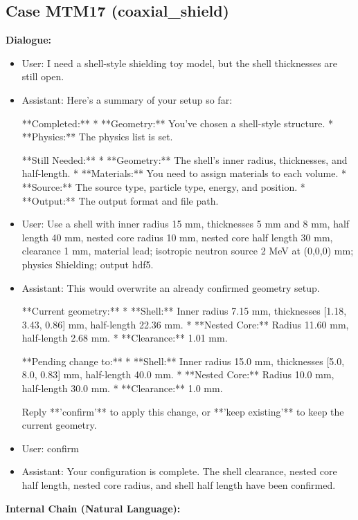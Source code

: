 \documentclass[11pt]{ctexart}
\begin{document}
\subsection{Case MTM17 (coaxial\_shield)}
\textbf{Dialogue:}
\begin{itemize}
\item User: I need a shell-style shielding toy model, but the shell thicknesses are still open.
\item Assistant: Here's a summary of your setup so far:

**Completed:**
*   **Geometry:** You've chosen a shell-style structure.
*   **Physics:** The physics list is set.

**Still Needed:**
*   **Geometry:** The shell's inner radius, thicknesses, and half-length.
*   **Materials:** You need to assign materials to each volume.
*   **Source:** The source type, particle type, energy, and position.
*   **Output:** The output format and file path.
\item User: Use a shell with inner radius 15 mm, thicknesses 5 mm and 8 mm, half length 40 mm, nested core radius 10 mm, nested core half length 30 mm, clearance 1 mm, material lead; isotropic neutron source 2 MeV at (0,0,0) mm; physics Shielding; output hdf5.
\item Assistant: This would overwrite an already confirmed geometry setup.

**Current geometry:**
*   **Shell:** Inner radius 7.15 mm, thicknesses [1.18, 3.43, 0.86] mm, half-length 22.36 mm.
*   **Nested Core:** Radius 11.60 mm, half-length 2.68 mm.
*   **Clearance:** 1.01 mm.

**Pending change to:**
*   **Shell:** Inner radius 15.0 mm, thicknesses [5.0, 8.0, 0.83] mm, half-length 40.0 mm.
*   **Nested Core:** Radius 10.0 mm, half-length 30.0 mm.
*   **Clearance:** 1.0 mm.

Reply **'confirm'** to apply this change, or **'keep existing'** to keep the current geometry.
\item User: confirm
\item Assistant: Your configuration is complete. The shell clearance, nested core half length, nested core radius, and shell half length have been confirmed.
\end{itemize}
\textbf{Internal Chain (Natural Language):}
\end{document}
